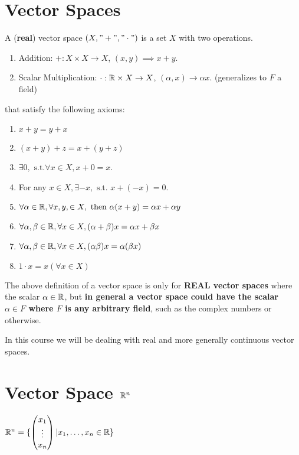 \documentclass[a4paper]{article}
\begin{document}
\section{Vector Spaces}
\begin{definition}
  A (\textbf{real}) vector space $(X, "+", "\cdot")$ is a set $X$ with two operations.
\begin{enumerate}
  \item Addition: $+: X \times X \to X$, $(x,y) \implies x + y$.
  \item Scalar Multiplication: $\cdot: \mathbb{R} \times X \to X$, $(\alpha, x) \to \alpha x$. (generalizes to $F$ a field) 
\end{enumerate}

that satisfy the following axioms:
\begin{enumerate}
  \item $x+y = y+x$
  \item $(x+y) + z = x + (y + z)$
  \item $\exists 0, \text{ s.t.} \forall x \in X, x + 0 = x$.
  \item For any $x \in X, \exists -x, \text{ s.t. } x + (-x) = 0$.
  \item $\forall \alpha \in \mathbb{R}, \forall x,y, \in X, \text{ then } \alpha(x+y) = \alpha x + \alpha y$
  \item $\forall \alpha, \beta \in \mathbb{R}, \forall x \in X, (\alpha + \beta)x = \alpha x + \beta x$
  \item $\forall \alpha, \beta \in \mathbb{R}, \forall x \in X, (\alpha \beta) x = \alpha (\beta x)$
  \item $1 \cdot x = x (\forall x \in X)$
\end{enumerate}
\end{definition}

\begin{remark}
  The above definition of a vector space is only for \textbf{REAL vector spaces} where the scalar $\alpha \in \mathbb{R}$, but \textbf{in
  general a vector space could have the scalar $\alpha \in F$ where $F$ is any arbitrary field}, such as the complex numbers
  or otherwise.
\end{remark}


\begin{remark}
  In this course we will be dealing with real and more generally continuous vector spaces.

\end{remark}

\section{Vector Space $\mathbb{R}^n$}
$\mathbb{R}^{n} = \{\begin{pmatrix} x_1\\ \vdots\\ x_n \end{pmatrix} | x_1, \ldots, x_n \in \mathbb{R} \}$
\end{document}
